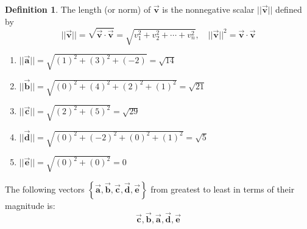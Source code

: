 \documentclass[letter,11pt]{article}
\theoremstyle{definition}
\newtheorem{definition}{Definition}[section]
\begin{document}
\begin{tcolorbox}[boxrule=1mm, width=(.9\linewidth),before=\hfill,after=\hfill,adjusted title={Problem 4 Solutions}]
    \begin{definition}
         The length (or norm) of $\vec{\boldsymbol{v}}$ is the nonnegative scalar $||\vec{\boldsymbol{v}}||$ defined by $$||\vec{\boldsymbol{v}}|| = \sqrt{\vec{\boldsymbol{v}}\cdot \vec{\boldsymbol{v}}} = \sqrt{v_{1}^{2}+v_{2}^{2}+ \cdots + v_{n}^2}, \quad ||\vec{\boldsymbol{v}}||^2 = \vec{\boldsymbol{v}}\cdot \vec{\boldsymbol{v}}$$
    \end{definition}

    \tcblower

    \begin{enumerate}[label = \Alph*.]
        \item $||\vec{\boldsymbol{a}}|| = \sqrt{(1)^2+(3)^2+(-2)} = \sqrt{14}$
        \item $||\vec{\boldsymbol{b}}|| = \sqrt{(0)^2+(4)^2+(2)^2+(1)^2} = \sqrt{21}$
        \item $||\vec{\boldsymbol{c}}|| = \sqrt{(2)^2+(5)^2} = \sqrt{29}$
        \item $||\vec{\boldsymbol{d}}|| = \sqrt{(0)^2+(-2)^2+(0)^2+(1)^2} = \sqrt{5}$
        \item $||\vec{\boldsymbol{e}}|| = \sqrt{(0)^2+(0)^2} = 0$
    \end{enumerate}

    The following vectors $\left\{\vec{\boldsymbol{a}}, \vec{\boldsymbol{b}}, \vec{\boldsymbol{c}},\vec{\boldsymbol{d}}, \vec{\boldsymbol{e}}\right\}$ from greatest to least in terms of their magnitude is: $$\boxed{\vec{\boldsymbol{c}}, \vec{\boldsymbol{b}}, \vec{\boldsymbol{a}}, \vec{\boldsymbol{d}}, \vec{\boldsymbol{e}}}$$
    
\end{tcolorbox}

\newpage
\end{document}
